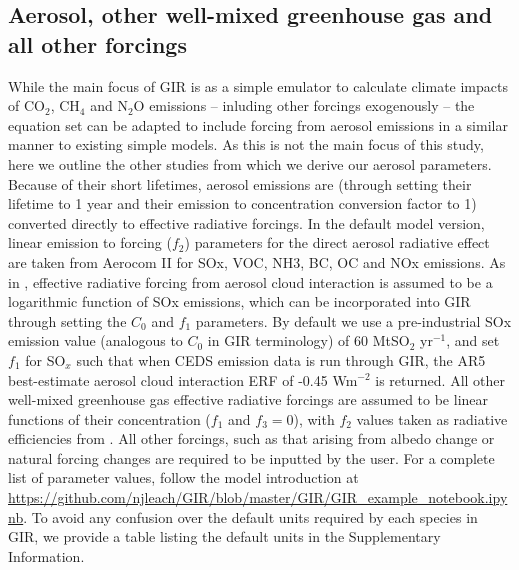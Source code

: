 \documentclass[gmd, manuscript]{copernicus}
\begin{document}
\subsection*{Aerosol, other well-mixed greenhouse gas and all other forcings}
While the main focus of GIR is as a simple emulator to calculate climate impacts of CO$_2$, CH$_4$ and N$_2$O emissions -- inluding other forcings exogenously -- the equation set can be adapted to include forcing from aerosol emissions in a similar manner to existing simple models. As this is not the main focus of this study, here we outline the other studies from which we derive our aerosol parameters. Because of their short lifetimes, aerosol emissions are (through setting their lifetime to 1 year and their emission to concentration conversion factor to 1) converted directly to effective radiative forcings. In the default model version, linear emission to forcing ($f_2$) parameters for the direct aerosol radiative effect are taken from Aerocom II \citep{Myhre2013a} for SOx, VOC, NH3, BC, OC and NOx emissions. As in \cite{Stevens2015}, effective radiative forcing from aerosol cloud interaction is assumed to be a logarithmic function of SOx emissions, which can be incorporated into GIR through setting the $C_0$ and $f_1$ parameters. By default we use a pre-industrial SOx emission value (analogous to $C_0$ in GIR terminology) of 60 MtSO$_2$ yr$^{-1}$, and set $f_1$ for SO$_x$ such that when CEDS emission data is run through GIR, the AR5 best-estimate aerosol cloud interaction ERF of -0.45 Wm$^{-2}$ is returned. All other well-mixed greenhouse gas effective radiative forcings are assumed to be linear functions of their concentration ($f_1$ and $f_3 = 0$), with $f_2$ values taken as radiative efficiencies from \cite{Etminan}.  All other forcings, such as that arising from albedo change or natural forcing changes are required to be inputted by the user. For a complete list of parameter values, follow the model introduction at \url{https://github.com/njleach/GIR/blob/master/GIR/GIR_example_notebook.ipynb}. To avoid any confusion over the default units required by each species in GIR, we provide a table listing the default units in the Supplementary Information.
\end{document}
